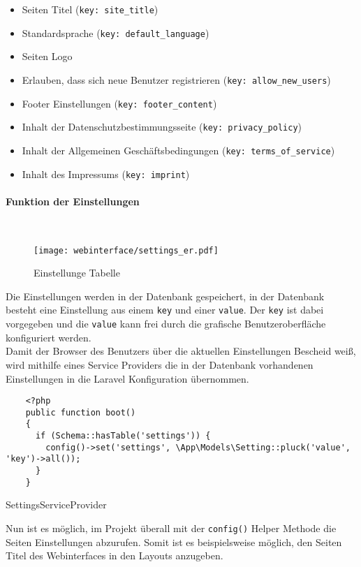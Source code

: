 \begin{itemize}
  \item Seiten Titel (\verb|key: site_title|)
  \item Standardsprache (\verb|key: default_language|)
  \item Seiten Logo
  \item Erlauben, dass sich neue Benutzer registrieren (\verb|key: allow_new_users|)
  \item Footer Einstellungen (\verb|key: footer_content|)
  \item Inhalt der Datenschutzbestimmungsseite (\verb|key: privacy_policy|)
  \item Inhalt der Allgemeinen Geschäftsbedingungen (\verb|key: terms_of_service|)
  \item Inhalt des Impressums (\verb|key: imprint|)
\end{itemize}

\paragraph{Funktion der Einstellungen}\mbox{}\\

\begin{figure}[H]
  \centering
  \texttt{[image: webinterface/settings\_er.pdf]}
  \caption{Einstellunge Tabelle}
\end{figure}

Die Einstellungen werden in der Datenbank gespeichert, in der Datenbank besteht eine Einstellung
aus einem \verb|key| und einer \verb|value|. Der \verb|key| ist dabei vorgegeben und
die \verb|value| kann frei durch die grafische Benutzeroberfläche konfiguriert werden.\\

Damit der Browser des Benutzers über die aktuellen Einstellungen Bescheid weiß,
wird mithilfe eines Service Providers die in der Datenbank vorhandenen
Einstellungen in die Laravel Konfiguration übernommen.

\begin{listing}[H]
  \begin{verbatim}
    <?php
    public function boot()
    {
      if (Schema::hasTable('settings')) {
        config()->set('settings', \App\Models\Setting::pluck('value', 'key')->all());
      }
    }
  \end{verbatim}
  \caption{SettingsServiceProvider}
\end{listing}

Nun ist es möglich, im Projekt überall mit der \verb|config()| Helper Methode die
Seiten Einstellungen abzurufen. Somit ist es beispielsweise möglich, den Seiten
Titel des Webinterfaces in den Layouts anzugeben.

